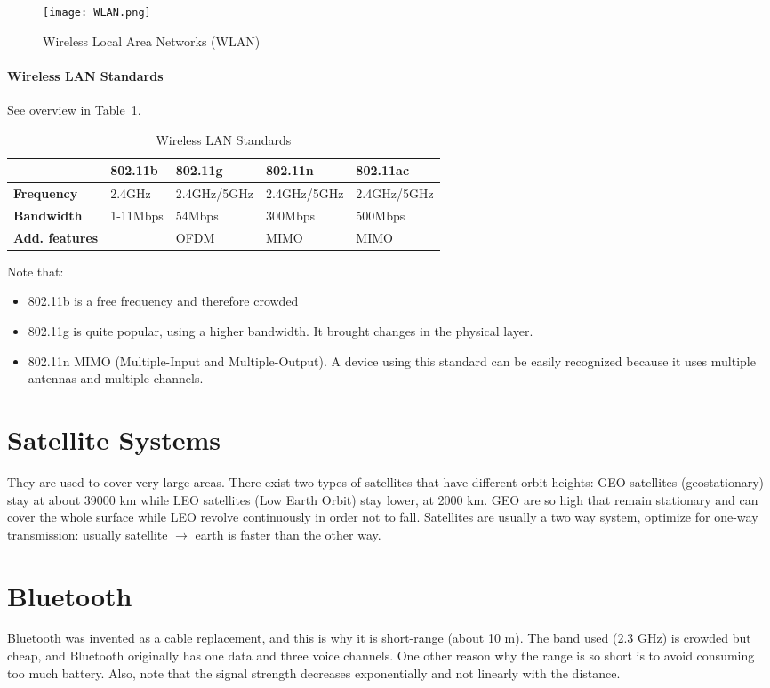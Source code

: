 \begin{figure}[t]
  \centering
  \texttt{[image: WLAN.png]}
  \caption{Wireless Local Area Networks (WLAN)}			
  
  \label{fig:cws:WLAN}
\end{figure}

\paragraph*{Wireless LAN Standards}
See overview in Table~\ref{tab:cws:WLANStd}.
\begin{table}[b]
\centering
\begin{tabular}{l|l|l|l|l|}
\cline{2-5}
 &\textbf{802.11b}     & \textbf{802.11g}     & \textbf{802.11n}     & \textbf{802.11ac}    \\ \hline
\textbf{Frequency}    &2.4GHz   & 2.4GHz/5GHz & 2.4GHz/5GHz & 2.4GHz/5GHz \\ \hline
\textbf{Bandwidth}    &1-11Mbps & 54Mbps      & 300Mbps     & 500Mbps     \\ \hline
\textbf{Add. features}&         & OFDM        & MIMO        & MIMO        \\ \hline
\end{tabular}
\caption{Wireless LAN Standards}
\label{tab:cws:WLANStd}
\end{table}


Note that:
\begin{itemize}
\item 802.11b is a free frequency and therefore crowded
\item 802.11g is quite popular, using a higher bandwidth. It 
  brought changes in the physical layer.
\item 802.11n MIMO (Multiple-Input and Multiple-Output). A 
  device using this standard can be easily recognized because it uses multiple 
  antennas and multiple channels.
\end{itemize}

\section{Satellite Systems}
They are used to cover very large areas. There exist two types of 
satellites that have different orbit heights: GEO satellites (geostationary) 
stay at about 39000 km while LEO satellites (Low Earth Orbit) stay lower, at 
2000 km. GEO are so high that remain stationary and can cover the whole surface 
while LEO revolve continuously in order not to fall.
Satellites are usually a two way system, optimize for one-way 
transmission: usually satellite $\to$ earth is faster than the other way.

\section{Bluetooth}
Bluetooth was invented as a cable replacement, and this is why it is 
short-range (about 10 m). The band used (2.3 GHz) is crowded but cheap, and 
Bluetooth originally has one data and three voice channels.
One other reason why the range is so short is to avoid consuming too much 
battery. Also, note that the signal strength decreases exponentially and not 
linearly with the distance.


